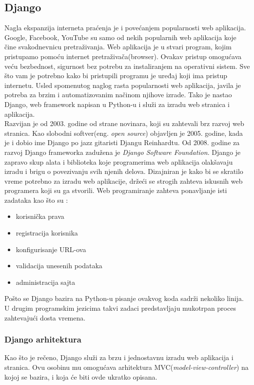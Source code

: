\documentclass[12pt]{article}
\begin{document}
\subsection{Django}

Nagla ekspanzija interneta praćenja je i povećanjem popularnosti web aplikacija. Google, Facebook, YouTube su samo od nekih popularnih web aplikacija koje čine svakodnevnicu pretraživanja. Web aplikacija je u stvari program, kojim pristupamo pomoću internet pretraživača(browser). Ovakav pristup omogućava veću bezbednost, sigurnost bez potrebu za instaliranjem na operativni sistem. Sve što vam je potrebno kako bi pristupili programu je uređaj koji ima pristup internetu. 
Usled spomenutog naglog rasta popularnosti web aplikacija, javila je potreba za brzim i automatizovanim načinom njihove izrade. Tako je nastao Django, web framework napisan u Python-u i služi za izradu web stranica i aplikacija. \\

Razvijan je od 2003. godine od strane novinara, koji su zahtevali brz razvoj web stranica. Kao slobodni softver(eng. \textsl{open source}) objavljen je 2005. godine, kada je i dobio ime Django po jazz gitaristi Djangu Reinhardtu. Od 2008. godine za razvoj Django frameworka zadužena je \textsl{Django Software Foundation}.
Django je zapravo skup alata i biblioteka koje programerima web aplikacija olakšavaju 
izradu i brigu o povezivanju svih njenih delova. Dizajniran je kako bi se skratilo vreme potrebno za izradu web aplikacije, držeći se strogih zahteva iskusnih web programera koji su ga stvorili. Web programiranje zahteva ponavljanje isti zadataka kao što su :
\begin{itemize}
\item korisnička prava
\item registracija korisnika
\item konfigurisanje URL-ova
\item validacija unesenih podataka
\item administracija sajta
\end{itemize}
Pošto se Django bazira na Python-u pisanje ovakvog koda sadrži nekoliko linija. U drugim programskim jezicima takvi zadaci predstavljaju mukotrpan proces zahtevajući dosta vremena. 
\subsubsection{Django arhitektura}
Kao što je rečeno, Django služi za brzu i jednostavnu izradu web aplikacija i stranica.  Ovu osobinu mu omogućava arhitektura MVC(\textsl{model-view-controller}) na kojoj se bazira, i koja će biti ovde ukratko opisana. 
\end{document}

